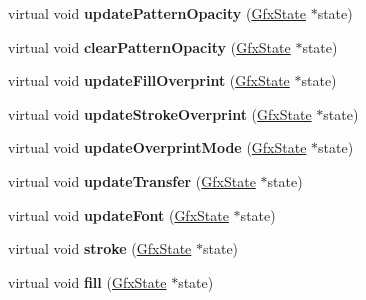 \begin{DoxyCompactItemize}
\item 
\mbox{\label{class_splash_output_dev_ae1a1ef7608befd913335703e2847306a}} 
virtual void {\bfseries update\+Pattern\+Opacity} (\hyperlink{class_gfx_state}{Gfx\+State} $\ast$state)
\item 
\mbox{\label{class_splash_output_dev_aa3084029e805378e10251259c744db26}} 
virtual void {\bfseries clear\+Pattern\+Opacity} (\hyperlink{class_gfx_state}{Gfx\+State} $\ast$state)
\item 
\mbox{\label{class_splash_output_dev_acd6c98a1141321a780ae2a97c8c17af1}} 
virtual void {\bfseries update\+Fill\+Overprint} (\hyperlink{class_gfx_state}{Gfx\+State} $\ast$state)
\item 
\mbox{\label{class_splash_output_dev_ad84da47f884d02380e98a023be897341}} 
virtual void {\bfseries update\+Stroke\+Overprint} (\hyperlink{class_gfx_state}{Gfx\+State} $\ast$state)
\item 
\mbox{\label{class_splash_output_dev_ad571992f5b6bb521ea584e59fc71d38d}} 
virtual void {\bfseries update\+Overprint\+Mode} (\hyperlink{class_gfx_state}{Gfx\+State} $\ast$state)
\item 
\mbox{\label{class_splash_output_dev_a53a0fbb6a8eae6ad5117077baf88f1f6}} 
virtual void {\bfseries update\+Transfer} (\hyperlink{class_gfx_state}{Gfx\+State} $\ast$state)
\item 
\mbox{\label{class_splash_output_dev_a6bfd5a77f1f7f3d993e3910b3af6ed00}} 
virtual void {\bfseries update\+Font} (\hyperlink{class_gfx_state}{Gfx\+State} $\ast$state)
\item 
\mbox{\label{class_splash_output_dev_a04248923064a683ada958ce3a5c8c6ef}} 
virtual void {\bfseries stroke} (\hyperlink{class_gfx_state}{Gfx\+State} $\ast$state)
\item 
\mbox{\label{class_splash_output_dev_ac88f3dc99f6e8835d092e41196682f93}} 
virtual void {\bfseries fill} (\hyperlink{class_gfx_state}{Gfx\+State} $\ast$state)

\end{DoxyCompactItemize}
